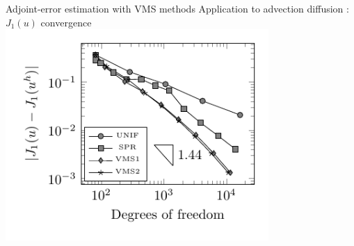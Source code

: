 \documentclass[fleqn]{beamer}
\begin{document}
\begin{frame}{Adjoint-error estimation with VMS methods}
{Application to advection diffusion : $J_1(u)$ convergence}
\includegraphics[width=0.75\textwidth]{../img/vms_lshape_global_convergence}
\end{frame}

\end{document}
